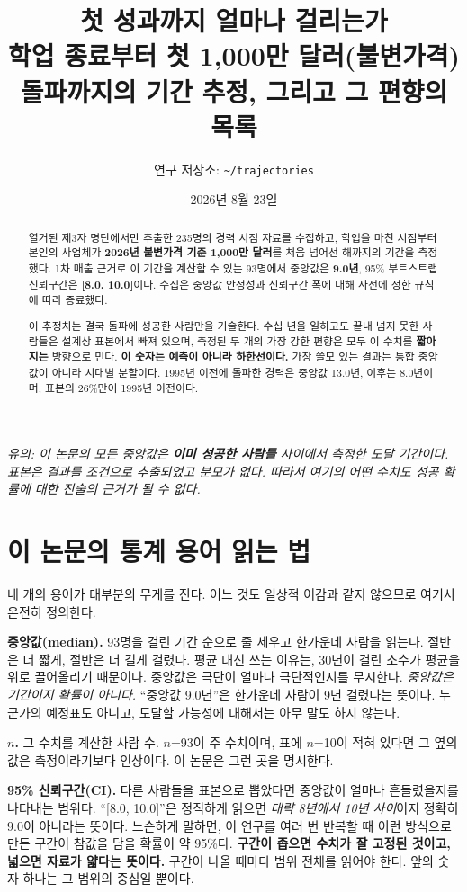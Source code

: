 \documentclass[11pt]{article}
\title{\bfseries 첫 성과까지 얼마나 걸리는가\\[0.35em]
\large 학업 종료부터 첫 1{,}000만 달러(불변가격) 돌파까지의 기간 추정,
그리고 그 편향의 목록}
\author{\normalsize 연구 저장소: \texttt{\textasciitilde/trajectories}}
\date{\normalsize 2026년 8월 23일}
\newcommand{\floor}{\emph{\small 유의: 이 논문의 모든 중앙값은 \textbf{이미 성공한
사람들} 사이에서 측정한 도달 기간이다. 표본은 결과를 조건으로 추출되었고 분모가
없다. 따라서 여기의 어떤 수치도 성공 확률에 대한 진술의 근거가 될 수 없다.}\par\medskip}
\begin{document}
\maketitle

\begin{abstract}
\noindent 열거된 제3자 명단에서만 추출한 235명의 경력 시점 자료를 수집하고, 학업을
마친 시점부터 본인의 사업체가 \textbf{2026년 불변가격 기준 1{,}000만 달러}를 처음
넘어선 해까지의 기간을 측정했다. 1차 매출 근거로 이 기간을 계산할 수 있는 93명에서
중앙값은 \textbf{9.0년}, 95\% 부트스트랩 신뢰구간은 \textbf{[8.0, 10.0]}이다. 수집은
중앙값 안정성과 신뢰구간 폭에 대해 사전에 정한 규칙에 따라 종료했다.

이 추정치는 결국 돌파에 성공한 사람만을 기술한다. 수십 년을 일하고도 끝내 넘지 못한
사람들은 설계상 표본에서 빠져 있으며, 측정된 두 개의 가장 강한 편향은 모두 이 수치를
\textbf{짧아지는} 방향으로 민다. \textbf{이 숫자는 예측이 아니라 하한선이다.} 가장
쓸모 있는 결과는 통합 중앙값이 아니라 시대별 분할이다. 1995년 이전에 돌파한 경력은
중앙값 13.0년, 이후는 8.0년이며, 표본의 26\%만이 1995년 이전이다.
\end{abstract}

\floor

\section*{이 논문의 통계 용어 읽는 법}

네 개의 용어가 대부분의 무게를 진다. 어느 것도 일상적 어감과 같지 않으므로 여기서
온전히 정의한다.

\textbf{중앙값(median).} 93명을 걸린 기간 순으로 줄 세우고 한가운데 사람을 읽는다.
절반은 더 짧게, 절반은 더 길게 걸렸다. 평균 대신 쓰는 이유는, 30년이 걸린 소수가
평균을 위로 끌어올리기 때문이다. 중앙값은 극단이 얼마나 극단적인지를 무시한다.
\emph{중앙값은 기간이지 확률이 아니다.} ``중앙값 9.0년''은 한가운데 사람이 9년
걸렸다는 뜻이다. 누군가의 예정표도 아니고, 도달할 가능성에 대해서는 아무 말도 하지
않는다.

\textbf{$n$.} 그 수치를 계산한 사람 수. $n$=93이 주 수치이며, 표에 $n$=10이 적혀
있다면 그 옆의 값은 측정이라기보다 인상이다. 이 논문은 그런 곳을 명시한다.

\textbf{95\% 신뢰구간(CI).} 다른 사람들을 표본으로 뽑았다면 중앙값이 얼마나 흔들렸을지를
나타내는 범위다. ``[8.0, 10.0]''은 정직하게 읽으면 \emph{대략 8년에서 10년 사이}이지
정확히 9.0이 아니라는 뜻이다. 느슨하게 말하면, 이 연구를 여러 번 반복할 때 이런 방식으로
만든 구간이 참값을 담을 확률이 약 95\%다. \textbf{구간이 좁으면 수치가 잘 고정된
것이고, 넓으면 자료가 얇다는 뜻이다.} 구간이 나올 때마다 범위 전체를 읽어야 한다. 앞의
숫자 하나는 그 범위의 중심일 뿐이다.
\end{document}

